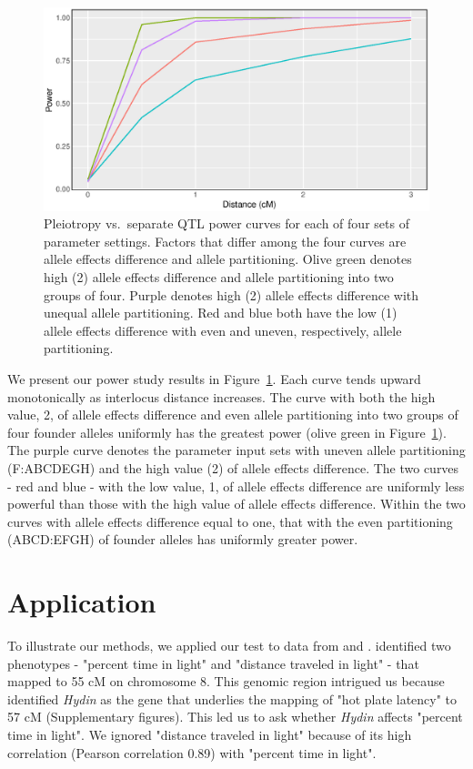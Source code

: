 \documentclass[12pt,twoside, lineno]{gsajnl}
\begin{document}
\begin{figure}
\includegraphics[width = \textwidth]{../R/power-curves.eps}
\caption{Pleiotropy vs.\ separate QTL power curves for each of four
  sets of parameter settings. Factors that differ among the four
  curves are allele effects difference and allele partitioning. Olive
  green denotes high (2) allele effects difference and allele
  partitioning into two groups of four. Purple denotes high (2) allele
  effects difference with unequal allele partitioning. Red and blue
  both have the low (1) allele effects difference with even and
  uneven, respectively, allele partitioning.}
\label{fig:power}
\end{figure}

We present our power study results in Figure~\ref{fig:power}. Each
curve tends upward monotonically as interlocus distance increases. The
curve with both the high value, 2, of allele effects difference and
even allele partitioning into two groups of four founder alleles
uniformly has the greatest power (olive green in Figure~\ref{fig:power}).
The purple curve denotes the parameter input sets
with uneven allele partitioning (F:ABCDEGH) and the high value (2) of
allele effects difference. The two curves - red and blue - with the
low value, 1, of allele effects difference are uniformly less powerful
than those with the high value of allele effects difference. Within
the two curves with allele effects difference equal to one, that with
the even partitioning (ABCD:EFGH) of founder alleles has uniformly
greater power.


\section{Application}
\label{sec:app}

To illustrate our methods, we applied our test to data from
\citet{logan2013high} and \citet{recla2014precise}.
\citet{logan2013high} identified two phenotypes - "percent time in
light" and "distance traveled in light" - that mapped to 55 cM on
chromosome 8. This genomic region intrigued us because
\citet{recla2014precise} identified \textit{Hydin} as the gene that
underlies the mapping of "hot plate latency" to 57 cM (Supplementary
figures). This led us to ask whether \textit{Hydin} affects "percent
time in light". We ignored "distance traveled in light" because of its
high correlation (Pearson correlation 0.89) with "percent time in
light".
\end{document}
